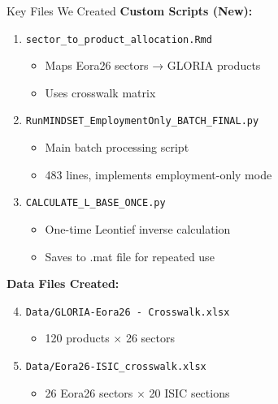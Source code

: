 \documentclass[10pt]{beamer}
\begin{document}

\begin{frame}[fragile]{Key Files We Created}
\textbf{Custom Scripts (New):}

\vspace{0.2cm}

\begin{enumerate}
    \item \texttt{sector\_to\_product\_allocation.Rmd}
    \begin{itemize}
        \item Maps Eora26 sectors → GLORIA products
        \item Uses crosswalk matrix
    \end{itemize}

    \item \texttt{RunMINDSET\_EmploymentOnly\_BATCH\_FINAL.py}
    \begin{itemize}
        \item Main batch processing script
        \item 483 lines, implements employment-only mode
    \end{itemize}

    \item \texttt{CALCULATE\_L\_BASE\_ONCE.py}
    \begin{itemize}
        \item One-time Leontief inverse calculation
        \item Saves to .mat file for repeated use
    \end{itemize}
\end{enumerate}

\vspace{0.3cm}

\textbf{Data Files Created:}

\vspace{0.2cm}

\begin{enumerate}
    \setcounter{enumi}{3}

    \item \texttt{Data/GLORIA-Eora26 - Crosswalk.xlsx}
    \begin{itemize}
        \item 120 products $\times$ 26 sectors
    \end{itemize}

    \item \texttt{Data/Eora26-ISIC\_crosswalk.xlsx}
    \begin{itemize}
        \item 26 Eora26 sectors $\times$ 20 ISIC sections
    \end{itemize}


\end{enumerate}
\end{frame}
\end{document}
